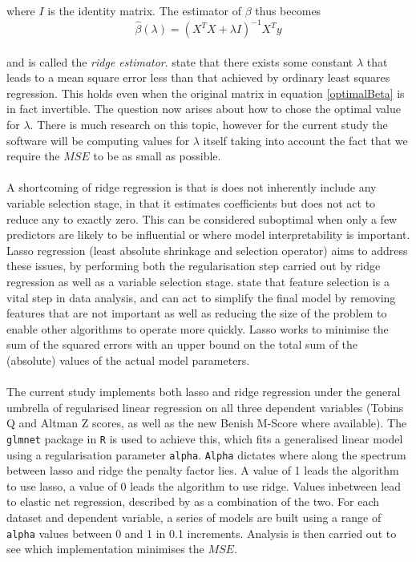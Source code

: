 {{where $I$ is the identity matrix. The estimator of $\beta$ thus becomes
\begin {equation}\label{ridgeEstimator}
\hat{\beta} (\lambda) =  (X^T X + \lambda I)^{- 1}X^T y
\end{equation}\\
and is called the {\it ridge estimator}. \cite{hoerlRidge} state that there exists some constant $\lambda$ that leads to a mean square error less than that achieved by ordinary least squares regression. This holds even when the original matrix in equation \ref{optimalBeta} is in fact invertible. The question now arises about how to chose the optimal value for $\lambda$. There is much research on this topic, however for the current study the software will be computing values for $\lambda$ itself taking into account the fact that we require the $MSE$ to be as small as possible.   \\\\
A shortcoming of ridge regression is that is does not inherently include any variable selection stage, in that it estimates coefficients but does not act to reduce any to exactly zero. This can be considered suboptimal when only a few predictors are likely to be influential or where model interpretability is important. Lasso regression (least absolute shrinkage and selection operator) aims to address these issues, by performing both the regularisation step carried out by ridge regression as well as a variable selection stage. \cite{fonti2017feature} state that feature selection is a vital step in data analysis, and can act to simplify the final model by removing features that are not important as well as reducing the size of the problem to enable other algorithms to operate more quickly. Lasso works to minimise the sum of the squared errors with an upper bound on the total sum of the (absolute) values of the actual model parameters.   \\\\
The current study implements both lasso and ridge regression under the general umbrella of regularised linear regression on all three dependent variables (Tobins Q and Altman Z scores, as well as the new Benish M-Score where available). The \texttt{glmnet} package in \texttt{R} is used to achieve this, which fits a generalised linear model using a regularisation parameter \texttt{alpha}. \texttt{Alpha} dictates where along the spectrum between lasso and ridge the penalty factor lies. A value of 1 leads the algorithm to use lasso, a value of 0 leads the algorithm to use ridge. Values inbetween lead to elastic net regression, described by \cite{fonti2017feature} as a combination of the two. For each dataset and dependent variable, a series of models are built using a range of \texttt{alpha} values between 0 and 1 in 0.1 increments. Analysis is then carried out to see which implementation minimises the $MSE$. }
}
